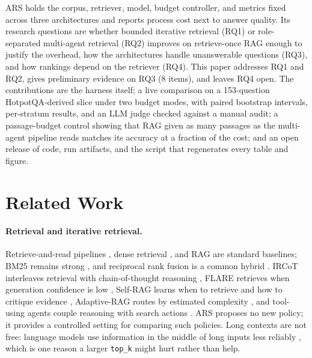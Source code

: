 \documentclass[11pt,a4paper]{article}
\begin{document}
ARS holds the corpus, retriever, model, budget controller, and metrics fixed
across three architectures and reports process cost next to answer quality.
Its research questions are whether bounded iterative retrieval (RQ1) or
role-separated multi-agent retrieval (RQ2) improves on retrieve-once RAG
enough to justify the overhead, how the architectures handle unanswerable
questions (RQ3), and how rankings depend on the retriever (RQ4).
This paper addresses RQ1 and RQ2, gives preliminary evidence on RQ3
(8 items), and leaves RQ4 open.
The contributions are the harness itself; a live comparison on a
153-question HotpotQA-derived slice under two budget modes, with paired
bootstrap intervals, per-stratum results, and an LLM judge checked against a
manual audit; a passage-budget control showing that RAG given as many
passages as the multi-agent pipeline reads matches its accuracy at a fraction
of the cost; and an open release of code, run artifacts, and the script that
regenerates every table and figure.

\section{Related Work}
\label{sec:related}

\paragraph{Retrieval and iterative retrieval.}
Retrieve-and-read pipelines \citep{chen2017drqa}, dense retrieval
\citep{karpukhin2020dpr}, and RAG \citep{lewis2020rag} are standard
baselines; BM25 remains strong \citep{robertson2009bm25}, and reciprocal rank
fusion is a common hybrid \citep{cormack2009rrf}.
IRCoT interleaves retrieval with chain-of-thought reasoning
\citep{trivedi2023ircot}, FLARE retrieves when generation confidence is low
\citep{jiang2023flare}, Self-RAG learns when to retrieve and how to critique
evidence \citep{asai2023selfrag}, Adaptive-RAG routes by estimated complexity
\citep{jeong2024adaptiverag}, and tool-using agents couple reasoning with
search actions \citep{yao2023react,schick2023toolformer,press2023selfask}.
ARS proposes no new policy; it provides a controlled setting for comparing
such policies.
Long contexts are not free: language models use information in the middle of
long inputs less reliably \citep{liu2024lost}, which is one reason a larger
\texttt{top\_k} might hurt rather than help.
\end{document}
